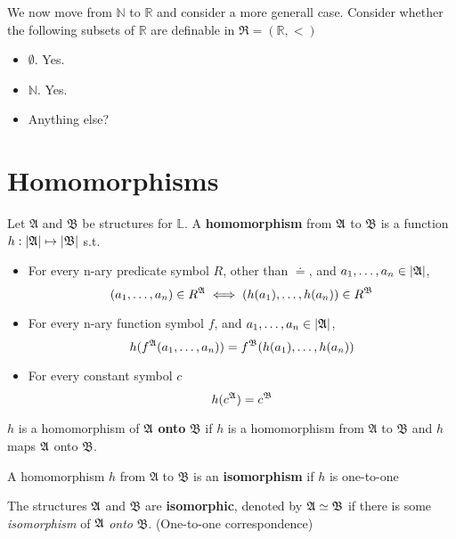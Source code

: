 We now move from $\mathbb{N}$ to $\mathbb{R}$ and consider a more generall case. Consider whether the following subsets of $\mathbb{R}$ are definable in $\mathfrak{R} = (\mathbb{R}, <)$

\begin{itemize}
    \item $\emptyset$. Yes.
    \item $\mathbb{N}$. Yes.
    \item Anything else?
\end{itemize}

\section{Homomorphisms}

\begin{definition}[Homomorphism]
    Let $\mathfrak{A}$ and $\mathfrak{B}$ be structures for $\mathbb{L}$. A \textbf{homomorphism} from $\mathfrak{A}$ to $\mathfrak{B}$ is a function $h:|\mathfrak{A}| \mapsto |\mathfrak{B}|$ s.t.
    \begin{itemize}
        \item For every n-ary predicate symbol $R$, other than $\doteq$, and $a_1,\dots,a_n \in |\mathfrak{A}|$,
        \[ (a_1,\dots,a_n) \in R^{\mathfrak{A}} \iff (h(a_1),\dots,h(a_n))\in R^{\mathfrak{B}} \]
        \item For every n-ary function symbol $f$, and $a_1,\dots,a_n \in |\mathfrak{A}|$,
        \[ h(f^{\mathfrak{A}}(a_1,\dots,a_n)) = f^\mathfrak{B}(h(a_1),\dots,h(a_n)) \]
        \item For every constant symbol $c$
        \[ h(c^{\mathfrak{A}}) = c^\mathfrak{B} \]
    \end{itemize}
\end{definition}

\begin{definition}
    $h$ is a homomorphism of $\mathfrak{A}$ \textbf{onto} $\mathfrak{B}$ if $h$ is a homomorphism from $\mathfrak{A}$ to $\mathfrak{B}$ and $h$ maps $\mathfrak{A}$ onto $\mathfrak{B}$.
\end{definition}

\begin{definition}[Isomorphism]
    A homomorphism $h$ from $\mathfrak{A}$ to $\mathfrak{B}$ is an \textbf{isomorphism} if $h$ is one-to-one
\end{definition}

\begin{definition}[Isomorphic]
    The structures $\mathfrak{A}$ and $\mathfrak{B}$ are \textbf{isomorphic}, denoted by $\mathfrak{A} \simeq \mathfrak{B}$ if there is some \emph{isomorphism} of $\mathfrak{A}$ \emph{onto} $\mathfrak{B}$. (One-to-one correspondence)
\end{definition}

